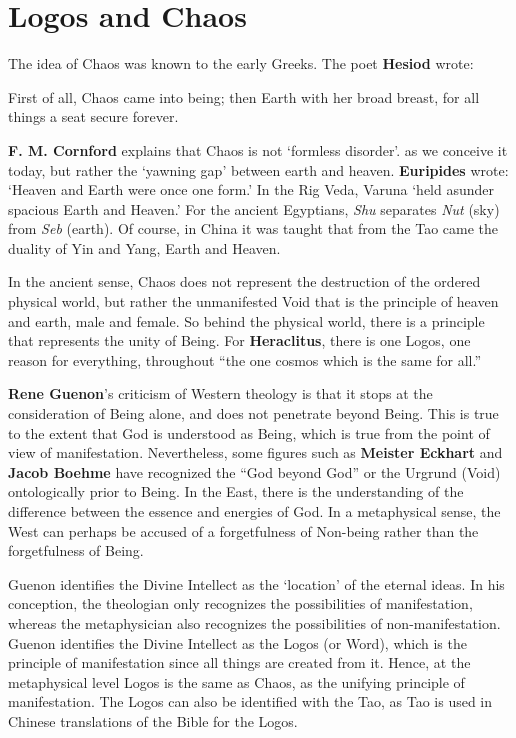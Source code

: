 \section{Logos and Chaos}

The idea of Chaos was known to the early Greeks. The poet \textbf{Hesiod} wrote:

\begin{quotex}
First of all, Chaos came into being; then Earth with her broad breast, for all things a seat secure forever. 

\end{quotex}
\textbf{F. M. Cornford} explains that Chaos is not `formless disorder'. as we conceive it today, but rather the `yawning gap' between earth and heaven. \textbf{Euripides} wrote: `Heaven and Earth were once one form.' In the Rig Veda, Varuna `held asunder spacious Earth and Heaven.' For the ancient Egyptians, \emph{Shu} separates \emph{Nut} (sky) from \emph{Seb} (earth). Of course, in China it was taught that from the Tao came the duality of Yin and Yang, Earth and Heaven.

In the ancient sense, Chaos does not represent the destruction of the ordered physical world, but rather the unmanifested Void that is the principle of heaven and earth, male and female. So behind the physical world, there is a principle that represents the unity of Being. For \textbf{Heraclitus}, there is one Logos, one reason for everything, throughout “the one cosmos which is the same for all.”

\textbf{Rene Guenon}'s criticism of Western theology is that it stops at the consideration of Being alone, and does not penetrate beyond Being. This is true to the extent that God is understood as Being, which is true from the point of view of manifestation. Nevertheless, some figures such as \textbf{Meister Eckhart} and \textbf{Jacob Boehme} have recognized the “God beyond God” or the Urgrund (Void) ontologically prior to Being. In the East, there is the understanding of the difference between the essence and energies of God. In a metaphysical sense, the West can perhaps be accused of a forgetfulness of Non-being rather than the forgetfulness of Being.

Guenon identifies the Divine Intellect as the `location' of the eternal ideas. In his conception, the theologian only recognizes the possibilities of manifestation, whereas the metaphysician also recognizes the possibilities of non-manifestation. Guenon identifies the Divine Intellect as the Logos (or Word), which is the principle of manifestation since all things are created from it. Hence, at the metaphysical level Logos is the same as Chaos, as the unifying principle of manifestation. The Logos can also be identified with the Tao, as Tao is used in Chinese translations of the Bible for the Logos.

